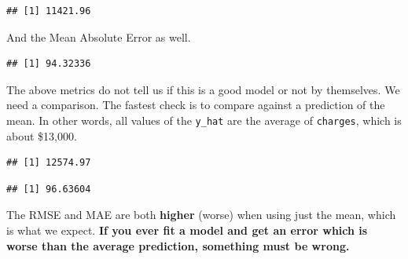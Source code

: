\documentclass[openany]{book}
\newenvironment{Shaded}{\begin{snugshade}}{\end{snugshade}}
\newcommand{\ControlFlowTok}[1]{\textcolor[rgb]{0.13,0.29,0.53}{\textbf{#1}}}
\newcommand{\KeywordTok}[1]{\textcolor[rgb]{0.13,0.29,0.53}{\textbf{#1}}}
\newcommand{\NormalTok}[1]{#1}
\newcommand{\OperatorTok}[1]{\textcolor[rgb]{0.81,0.36,0.00}{\textbf{#1}}}
\newcommand{\StringTok}[1]{\textcolor[rgb]{0.31,0.60,0.02}{#1}}
\begin{document}
\begin{verbatim}
## [1] 11421.96
\end{verbatim}

And the Mean Absolute Error as well.

\begin{Shaded}
\end{Shaded}

\begin{verbatim}
## [1] 94.32336
\end{verbatim}

The above metrics do not tell us if this is a good model or not by themselves. We need a comparison. The fastest check is to compare against a prediction of the mean. In other words, all values of the \texttt{y\_hat} are the average of \texttt{charges}, which is about \$13,000.

\begin{Shaded}
\end{Shaded}

\begin{verbatim}
## [1] 12574.97
\end{verbatim}

\begin{Shaded}
\end{Shaded}

\begin{verbatim}
## [1] 96.63604
\end{verbatim}

The RMSE and MAE are both \textbf{higher} (worse) when using just the mean, which is what we expect. \textbf{If you ever fit a model and get an error which is worse than the average prediction, something must be wrong.}
\end{document}

